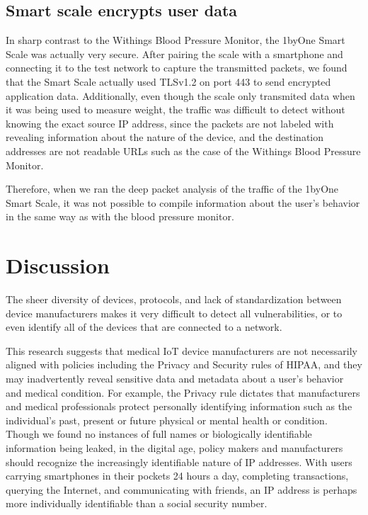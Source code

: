 \subsection{Smart scale encrypts user data}
In sharp contrast to the Withings Blood Pressure Monitor, the 1byOne Smart Scale was actually very secure. After pairing the scale with a smartphone and connecting it to the test network to capture the transmitted packets, we found that the Smart Scale actually used TLSv1.2 on port 443 to send encrypted application data. Additionally, even though the scale only transmited data when it was being used to measure weight, the traffic was difficult to detect without knowing the exact source IP address, since the packets are not labeled with revealing information about the nature of the device, and the destination addresses are not readable URLs such as the case of the Withings Blood Pressure Monitor. 

Therefore, when we ran the deep packet analysis of the traffic of the 1byOne Smart Scale, it was not possible to compile information about the user's behavior in the same way as with the blood pressure monitor. 


\section{Discussion}

The sheer diversity of devices, protocols, and lack of standardization between device manufacturers makes it very difficult to detect all vulnerabilities, or to even identify all of the devices that are connected to a network.

This research suggests that medical IoT device manufacturers are not necessarily aligned with policies including the Privacy and Security rules of HIPAA, and they may inadvertently reveal sensitive data and metadata about a user's behavior and medical condition. For example, the Privacy rule dictates that manufacturers and medical professionals protect personally identifying information such as the individual's past, present or future physical or mental health or condition. Though we found no instances of full names or biologically identifiable information being leaked, in the digital age, policy makers and manufacturers should recognize the increasingly identifiable nature of IP addresses. With users carrying smartphones in their pockets 24 hours a day, completing transactions, querying the Internet, and communicating with friends, an IP address is perhaps more individually identifiable than a social security number.

